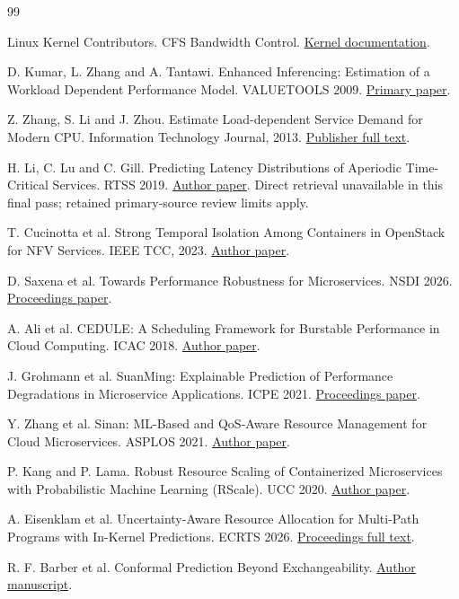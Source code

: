 \documentclass[10pt,a4paper]{article}
\begin{document}
\begingroup
\small
\begin{thebibliography}{99}
\setlength{\itemsep}{3pt plus 1pt}
\raggedright

 Linux Kernel Contributors. CFS Bandwidth Control. \href{https://docs.kernel.org/scheduler/sched-bwc.html}{Kernel documentation}.

 D. Kumar, L. Zhang and A. Tantawi. Enhanced Inferencing: Estimation of a Workload Dependent Performance Model. VALUETOOLS 2009. \href{https://eudl.eu/pdf/10.4108/ICST.VALUETOOLS2009.7799}{Primary paper}.

 Z. Zhang, S. Li and J. Zhou. Estimate Load-dependent Service Demand for Modern CPU. Information Technology Journal, 2013. \href{https://scialert.net/fulltext/amp.php?doi=itj.2013.632.639}{Publisher full text}.

 H. Li, C. Lu and C. Gill. Predicting Latency Distributions of Aperiodic Time-Critical Services. RTSS 2019. \href{https://www.cse.wustl.edu/~cdgill/publications/rtss19.pdf}{Author paper}. Direct retrieval unavailable in this final pass; retained primary-source review limits apply.

 T. Cucinotta et al. Strong Temporal Isolation Among Containers in OpenStack for NFV Services. IEEE TCC, 2023. \href{https://retis.santannapisa.it/people/nino/publication/TCC23.pdf}{Author paper}.

 D. Saxena et al. Towards Performance Robustness for Microservices. NSDI 2026. \href{https://www.usenix.org/system/files/nsdi26-saxena.pdf}{Proceedings paper}.

 A. Ali et al. CEDULE: A Scheduling Framework for Burstable Performance in Cloud Computing. ICAC 2018. \href{https://www2.cs.uh.edu/~fyan/Paper/Feng-ICAC18.pdf}{Author paper}.

 J. Grohmann et al. SuanMing: Explainable Prediction of Performance Degradations in Microservice Applications. ICPE 2021. \href{https://research.spec.org/icpe_proceedings/2021/proceedings/p165.pdf}{Proceedings paper}.

 Y. Zhang et al. Sinan: ML-Based and QoS-Aware Resource Management for Cloud Microservices. ASPLOS 2021. \href{https://people.csail.mit.edu/delimitrou/papers/2021.asplos.sinan.pdf}{Author paper}.

 P. Kang and P. Lama. Robust Resource Scaling of Containerized Microservices with Probabilistic Machine Learning (RScale). UCC 2020. \href{https://www.cs.utsa.edu/~plama/papers/UCC20.pdf}{Author paper}.

 A. Eisenklam et al. Uncertainty-Aware Resource Allocation for Multi-Path Programs with In-Kernel Predictions. ECRTS 2026. \href{https://drops.dagstuhl.de/storage/00lipics/lipics-vol375-ecrts2026/html/LIPIcs.ECRTS.2026.17/LIPIcs.ECRTS.2026.17.html}{Proceedings full text}.

 R. F. Barber et al. Conformal Prediction Beyond Exchangeability. \href{https://arxiv.org/html/2202.13415v4}{Author manuscript}.

\end{thebibliography}
\endgroup
\end{document}
